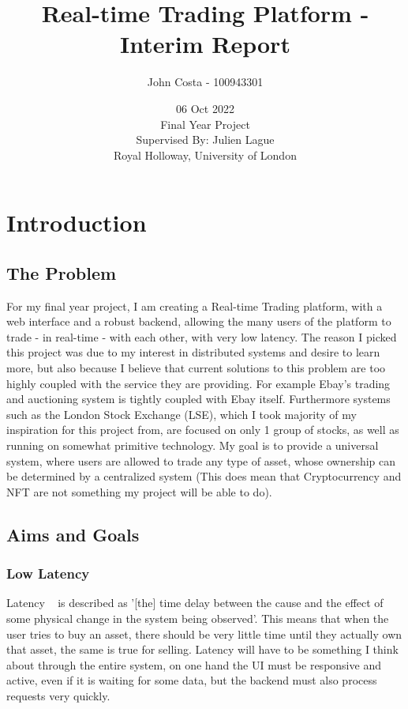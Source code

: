\documentclass[titlepage]{article}
\title{Real-time Trading Platform - Interim Report}
\author{John Costa - 100943301}
\date{06 Oct 2022 \\
  \Large{Final Year Project \\
Supervised By: Julien Lague \\
Royal Holloway, University of London}}
\begin{document}
\maketitle

\tableofcontents
\newpage

\section{Introduction}
\subsection{The Problem}
For my final year project, I am creating a Real-time Trading platform, with a web interface and a robust backend, allowing the many users of the platform to trade - in real-time - with each other, with very low latency. The reason I picked this project was due to my interest in distributed systems and desire to learn more, but also because I believe that current solutions to this problem are too highly coupled with the service they are providing. For example Ebay's trading and auctioning system is tightly coupled with Ebay itself. Furthermore systems such as the London Stock Exchange (LSE), which I took majority of my inspiration for this project from, are focused on only 1 group of stocks, as well as running on somewhat primitive technology. My goal is to provide a universal system, where users are allowed to trade any type of asset, whose ownership can be determined by a centralized system (This does mean that Cryptocurrency and NFT are not something my project will be able to do).

\subsection{Aims and Goals}

\subsubsection{Low Latency}
Latency ~\cite{latency} is described as '[the] time delay between the cause and the effect of some physical change in the system being observed'. This means that when the user tries to buy an asset, there should be very little time until they actually own that asset, the same is true for selling. Latency will have to be something I think about through the entire system, on one hand the UI must be responsive and active, even if it is waiting for some data, but the backend must also process requests very quickly.
\end{document}
